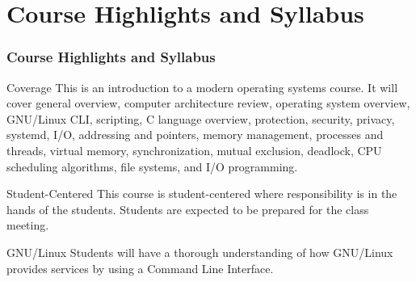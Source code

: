 \documentclass[aspectratio=169, xcolor=table, notheorems, hyperref={pdfpagelabels=false}]{beamer}
\begin{document}
\section{Course Highlights and Syllabus} 
\begin{frame}
\frametitle{Course Highlights and Syllabus}
\begin{block}{Coverage}
This is an introduction to a modern operating systems course. 
It will cover
general overview,
computer architecture review,
operating system overview,
GNU/Linux CLI,
scripting,
C language overview,
protection,
security,
privacy,
systemd,
I/O,
addressing and pointers,
memory management, 
processes and threads, 
virtual memory,
synchronization,
mutual exclusion, 
deadlock, 
CPU scheduling algorithms, 
file systems,
and
I/O programming.
\end{block}

\begin{block}{Student-Centered}
This course is student-centered where responsibility is
in the hands of the students. Students are expected to 
be prepared for the class meeting.
\end{block}

\begin{block}{GNU/Linux}
Students will have a thorough understanding of how GNU/Linux 
provides services by using a Command Line Interface.
\end{block}

\end{frame}














\end{document}
